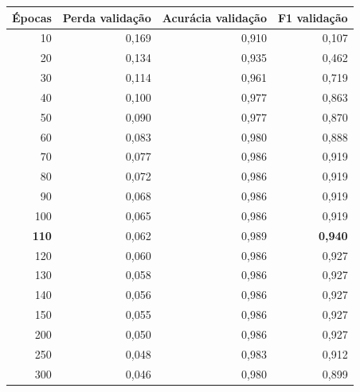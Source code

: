 \begin{tabular}{rrrr}
\toprule
Épocas & Perda validação & Acurácia validação & F1 validação \\
\midrule
10 & 0,169 & 0,910 & 0,107 \\
20 & 0,134 & 0,935 & 0,462 \\
30 & 0,114 & 0,961 & 0,719 \\
40 & 0,100 & 0,977 & 0,863 \\
50 & 0,090 & 0,977 & 0,870 \\
60 & 0,083 & 0,980 & 0,888 \\
70 & 0,077 & 0,986 & 0,919 \\
80 & 0,072 & 0,986 & 0,919 \\
90 & 0,068 & 0,986 & 0,919 \\
100 & 0,065 & 0,986 & 0,919 \\
\textbf{110} & 0,062 & 0,989 & \textbf{0,940} \\
120 & 0,060 & 0,986 & 0,927 \\
130 & 0,058 & 0,986 & 0,927 \\
140 & 0,056 & 0,986 & 0,927 \\
150 & 0,055 & 0,986 & 0,927 \\
200 & 0,050 & 0,986 & 0,927 \\
250 & 0,048 & 0,983 & 0,912 \\
300 & 0,046 & 0,980 & 0,899 \\
\bottomrule
\end{tabular}
